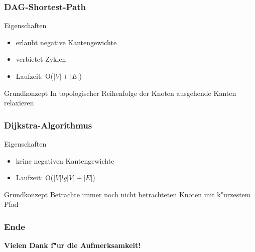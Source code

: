 \documentclass{beamer}
\begin{document}
\begin{frame}
\frametitle{DAG-Shortest-Path}
\begin{block}{Eigenschaften}
\begin{itemize}
\item erlaubt negative Kantengewichte
\item verbietet Zyklen
\item Laufzeit: O($|V| + |E|$)
\end{itemize}
\end{block}

\begin{alertblock}{Grundkonzept}
In topologischer Reihenfolge der Knoten ausgehende Kanten relaxieren
\end{alertblock}
\end{frame}


\begin{frame}
\frametitle{Dijkstra-Algorithmus}
\begin{block}{Eigenschaften}
\begin{itemize}
\item keine negativen Kantengewichte
\item Laufzeit: O($|V|lg|V| + |E|$)
\end{itemize}
\end{block}

\begin{alertblock}{Grundkonzept}
Betrachte immer noch nicht betrachteten Knoten mit k"urzestem Pfad
\end{alertblock}
\end{frame}

\begin{frame}
\frametitle{Ende}
\begin{center}
\textbf{\Huge Vielen Dank f"ur die Aufmerksamkeit!}
\end{center}
\end{frame}
\end{document}
